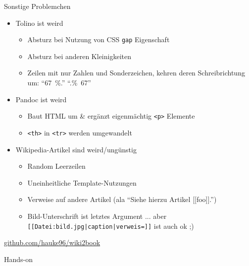 \documentclass[9pt]{beamer}
\begin{document}
	\begin{frame}{Sonstige Problemchen}
		\begin{itemize}
			\item Tolino ist weird
			\begin{itemize}
				\item Absturz bei Nutzung von CSS \texttt{gap} Eigenschaft
				\item Absturz bei anderen Kleinigkeiten
				\item Zeilen mit nur Zahlen und Sonderzeichen, kehren deren Schreibrichtung um: "`67\ \%."' \textrightarrow "`.\%\ 67"'
			\end{itemize}\pause
			\item Pandoc ist weird
			\begin{itemize}
				\item Baut HTML um \& ergänzt eigenmächtig \texttt{<p>} Elemente
				\item \texttt{<th>} in \texttt{<tr>} werden umgewandelt
			\end{itemize}\pause
			\item Wikipedia-Artikel sind weird/ungünstig
			\begin{itemize}
				\item Random Leerzeilen
				\item Uneinheitliche Template-Nutzungen
				\item Verweise auf andere Artikel (ala "`Siehe hierzu Artikel [[foo]]."')
				\item Bild-Unterschrift ist letztes Argument ... aber \texttt{[[Datei:bild.jpg|caption|verweis=]]} ist auch ok ;)
			\end{itemize}
		\end{itemize}
	\end{frame}
	
	\begin{frame}
		\vspace{1cm}
		\centering\href{https://github.com/hauke96/wiki2book}{github.com/hauke96/wiki2book}
	\end{frame}
	
	\begin{frame}
		\vspace{1cm}
		\centering Hands-on
	\end{frame}
\end{document}
